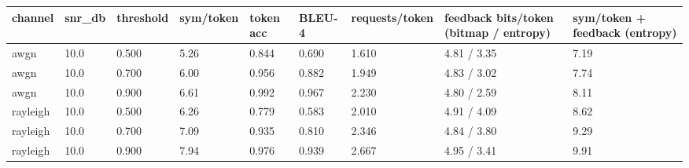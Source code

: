 \begin{tabular}{lllllllll}
\hline
channel & snr\_db & threshold & sym/token & token acc & BLEU-4 & requests/token & feedback bits/token (bitmap / entropy) & sym/token + feedback (entropy) \\
\hline
awgn & 10.0 & 0.500 & 5.26 & 0.844 & 0.690 & 1.610 & 4.81 / 3.35 & 7.19 \\
awgn & 10.0 & 0.700 & 6.00 & 0.956 & 0.882 & 1.949 & 4.83 / 3.02 & 7.74 \\
awgn & 10.0 & 0.900 & 6.61 & 0.992 & 0.967 & 2.230 & 4.80 / 2.59 & 8.11 \\
rayleigh & 10.0 & 0.500 & 6.26 & 0.779 & 0.583 & 2.010 & 4.91 / 4.09 & 8.62 \\
rayleigh & 10.0 & 0.700 & 7.09 & 0.935 & 0.810 & 2.346 & 4.84 / 3.80 & 9.29 \\
rayleigh & 10.0 & 0.900 & 7.94 & 0.976 & 0.939 & 2.667 & 4.95 / 3.41 & 9.91 \\
\hline
\end{tabular}
